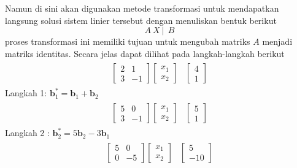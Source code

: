 \documentclass{article}   %
\begin{document}
	
	Namun di sini akan digunakan metode transformasi untuk mendapatkan langsung solusi sistem linier tersebut dengan menuliskan bentuk berikut
	$$A~X~|~~B$$
	proses transformasi ini memiliki tujuan untuk mengubah matriks $A$ menjadi matriks identitas. Secara jelas dapat dilihat pada langkah-langkah berikut
		\begin{align*}
		\begin{array}{r|r} 
			\left[
			\begin{array}{rr} 
				2 & 1 \\
				3 & -1 
			\end{array} 
			\right] \left[
			\begin{array}{r} 
				x_1 \\ 
				x_2  
			\end{array}
			\right]  &  \left[
			\begin{array}{r} 
				4\\
				1 
			\end{array} 
			\right]
		\end{array}
	\end{align*}
	Langkah 1: $\textbf{b}^*_1= \textbf{b}_1 + \textbf{b}_2$ \\
		\begin{align*}
		\begin{array}{r|r} 
			\left[
			\begin{array}{rr} 
				5 & 0 \\
				3 & -1 
			\end{array} 
			\right] \left[
			\begin{array}{r} 
				x_1 \\ 
				x_2  
			\end{array}
			\right]  &  \left[
			\begin{array}{r} 
				5\\
				1 
			\end{array} 
			\right]
		\end{array}
	\end{align*}
	Langkah 2 : $\textbf{b}^*_2= 5\textbf{b}_2 - 3\textbf{b}_1$ \\
		\begin{align*}
		\begin{array}{r|r} 
			\left[
			\begin{array}{rr} 
				5 & 0 \\
				0 & -5 
			\end{array} 
			\right] \left[
			\begin{array}{r} 
				x_1 \\ 
				x_2 
			\end{array}
			\right]  &  \left[
			\begin{array}{r} 
				5\\
				-10 
			\end{array} 
			\right]
		\end{array}
	\end{align*}
\end{document}
